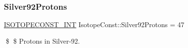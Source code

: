 \subsubsection{\texorpdfstring{Silver92\+Protons}{Silver92Protons}}
{\footnotesize\ttfamily \mbox{\hyperlink{group___isotope_const-_macros_ga5f18360b3e99483a35c32d789e62621c}{I\+S\+O\+T\+O\+P\+E\+C\+O\+N\+S\+T\+\_\+\+I\+NT}} Isotope\+Const\+::\+Silver92\+Protons = 47}

\$ \$ Protons in Silver-\/92. 